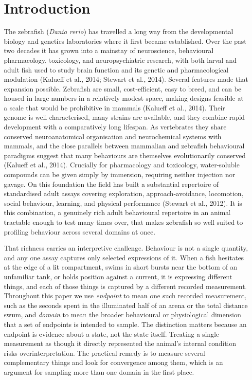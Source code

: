 \documentclass[12pt,a4paper]{article}
\begin{document}
\section{Introduction}

The zebrafish (\textit{Danio rerio}) has travelled a long way from the developmental biology and genetics laboratories where it first became established. Over the past two decades it has grown into a mainstay of neuroscience, behavioural pharmacology, toxicology, and neuropsychiatric research, with both larval and adult fish used to study brain function and its genetic and pharmacological modulation (Kalueff et al., 2014; Stewart et al., 2014). Several features made that expansion possible. Zebrafish are small, cost-efficient, easy to breed, and can be housed in large numbers in a relatively modest space, making designs feasible at a scale that would be prohibitive in mammals (Kalueff et al., 2014). Their genome is well characterised, many strains are available, and they combine rapid development with a comparatively long lifespan. As vertebrates they share conserved neuroanatomical organisation and neurochemical systems with mammals, and the close parallels between mammalian and zebrafish behavioural paradigms suggest that many behaviours are themselves evolutionarily conserved (Kalueff et al., 2014). Crucially for pharmacology and toxicology, water-soluble compounds can be given simply by immersion, requiring neither injection nor gavage. On this foundation the field has built a substantial repertoire of standardised adult assays covering exploration, approach-avoidance, locomotion, social behaviour, learning, and physical performance (Stewart et al., 2012). It is this combination, a genuinely rich adult behavioural repertoire in an animal tractable enough to test many times over, that makes zebrafish so well suited to profiling behaviour across several domains at once.

That richness carries an interpretive challenge. Behaviour is not a single quantity, and any one assay captures only selected expressions of it. When a fish hesitates at the edge of a lit compartment, swims in short bursts near the bottom of an unfamiliar tank, or holds position against a current, it is expressing different things, and each of those things is captured by a different recorded measurement. Throughout this paper we use \textit{endpoint} to mean one such recorded measurement, such as the seconds spent in the illuminated half of an arena or the total distance swum, and \textit{domain} to mean the broader behavioural or physiological dimension that a set of endpoints is intended to sample. The distinction matters because an endpoint is evidence about a state, not the state itself. Treating a single measurement as though it directly represented the animal's internal condition risks overinterpretation. The practical remedy is to measure several complementary things and look for convergence among them, which is an argument for sampling more than one domain in the first place.
\end{document}
